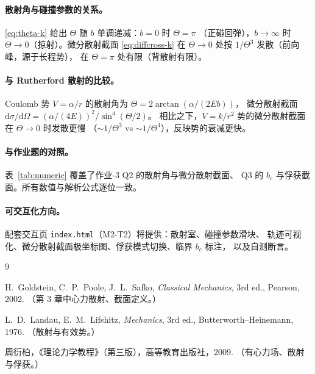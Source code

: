 \documentclass[UTF8,a4paper,11pt]{ctexart}
\begin{document}
\paragraph{散射角与碰撞参数的关系。}
\eqref{eq:theta-k} 给出 $\Theta$ 随 $b$ 单调递减：$b=0$ 时 $\Theta=\pi$
（正碰回弹），$b\to\infty$ 时 $\Theta\to0$（掠射）。微分散射截面
\eqref{eq:diffcross-k} 在 $\Theta\to0$ 处按 $1/\Theta^3$ 发散（前向峰，源于长程势），
在 $\Theta=\pi$ 处有限（背散射有限）。

\paragraph{与 Rutherford 散射的比较。}
Coulomb 势 $V=\alpha/r$ 的散射角为 $\Theta=2\arctan(\alpha/(2Eb))$，
微分散射截面 $\mathrm d\sigma/\mathrm d\Omega=(\alpha/(4E))^2/\sin^4(\Theta/2)$。
相比之下，$V=k/r^2$ 势的微分散射截面在 $\Theta\to0$ 时发散更慢
（$\sim 1/\Theta^3$ vs $\sim 1/\Theta^4$），反映势的衰减更快。

\paragraph{与作业题的对照。}
表~\ref{tab:numeric} 覆盖了作业-3 Q2 的散射角与微分散射截面、
Q3 的 $b_c$ 与俘获截面。所有数值与解析公式逐位一致。

\paragraph{可交互化方向。}
配套交互页 \texttt{index.html}（M2-T2）将提供：散射室、碰撞参数滑块、
轨迹可视化、微分散射截面极坐标图、俘获模式切换、临界 $b_c$ 标注，
以及自测断言。

\begin{thebibliography}{9}

H.~Goldstein, C.~P.~Poole, J.~L.~Safko,
\emph{Classical Mechanics}, 3rd ed., Pearson, 2002.
（第 3 章中心力散射、截面定义。）

L.~D.~Landau, E.~M.~Lifshitz,
\emph{Mechanics}, 3rd ed., Butterworth--Heinemann, 1976.
（散射与有效势。）

周衍柏，《理论力学教程》（第三版），高等教育出版社，2009.
（有心力场、散射与俘获。）

\end{thebibliography}
\end{document}
